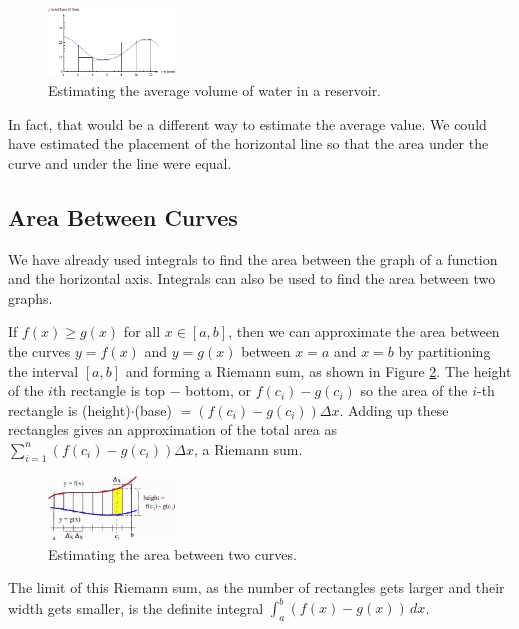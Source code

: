 \begin{example}
\begin{solution}
\begin{figure}[!ht]
  \centering
    \includegraphics[width=0.3\textwidth]{img/chap5/image056.png}
    \caption{Estimating the average volume of water in a reservoir.}
    \label{fig:5-8-reservoiravg}
\end{figure}

In fact, that would be a different way to estimate the average value. We could have estimated the placement of the horizontal line so that the area under the curve and under the line were equal.
\end{solution}\end{example}

\subsection{Area Between Curves}
We have already used integrals to find the area between the graph of a function and the horizontal axis. Integrals can also be used to find the area between two graphs.

If $f(x) \geq g(x)$ for all $x \in [a,b]$, then we can approximate the area between the curves $y=f(x)$ and $y=g(x)$ between $x=a$ and $x=b$ by partitioning the interval $[a,b]$ and forming a Riemann sum, as shown in Figure \ref{fig:5-8-abc}. The height of the $i$th rectangle is top $-$ bottom, or $f(c_i)-g(c_i)$ so the area of the $i$-th rectangle is (height)$\cdot$(base) $= (f(c_i)-g(c_i))\Delta x$. Adding up these rectangles gives an approximation of the total area as $\sum_{i=1}^n(f(c_i)-g(c_i))\Delta x$, a Riemann sum.

\begin{figure}[!ht]
  \centering
    \includegraphics[width=0.3\textwidth]{img/chap5/image049.png}
    \caption{Estimating the area between two curves.}
    \label{fig:5-8-abc}
\end{figure}
The limit of this Riemann sum, as the number of rectangles gets larger and their width gets smaller, is the definite integral $\displaystyle\int_a^b(f(x)-g(x))\,dx$.

